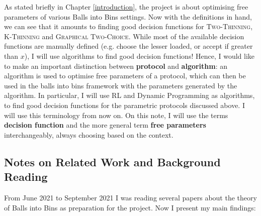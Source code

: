 As stated briefly in Chapter \ref{introduction}, the project is about optimising free parameters of various Balls into Bins settings. Now with the definitions in hand, we can see that it amounts to finding good decision functions for \textsc{Two-Thinning}, \textsc{K-Thinning} and \textsc{Graphical Two-Choice}. While most of the available decision functions are manually defined (e.g. choose the lesser loaded, or accept if greater than $x$), I will use algorithms to find good decision functions! Hence, I would like to make an important distinction between \textbf{protocol} and \textbf{algorithm}: an algorithm is used to optimise free parameters of a protocol, which can then be used in the balls into bins framework with the parameters generated by the algorithm. In particular, I will use RL and Dynamic Programming as algorithms, to find good decision functions for the parametric protocols discussed above. I will use this terminology from now on. On this note, I will use the terms \textbf{decision function} and the more general term \textbf{free parameters} interchangeably, always choosing based on the context. 


\subsection{Notes on Related Work and Background Reading}


From June 2021 to September 2021  I was reading several papers about the theory of Balls into Bins as preparation for the project. Now I present my main findings: 


